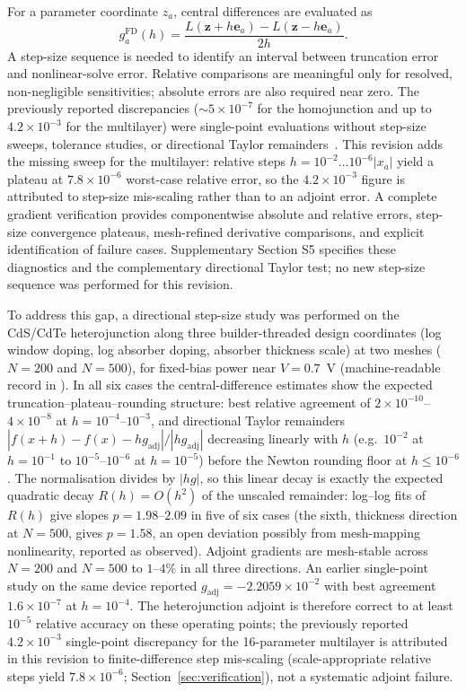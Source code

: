 For a parameter coordinate $z_a$, central differences are evaluated as
\begin{equation}
g_a^{\mathrm{FD}}(h)=
\frac{L(\boldsymbol z+h\boldsymbol e_a)-L(\boldsymbol z-h\boldsymbol e_a)}{2h}.
\end{equation}
A step-size sequence is needed to identify an interval between truncation
error and nonlinear-solve error. Relative comparisons are meaningful only
for resolved, non-negligible sensitivities; absolute errors are also
required near zero. The previously reported discrepancies ($\sim5\times10^{-7}$ for
the homojunction and up to $4.2\times10^{-3}$ for the multilayer) were
single-point evaluations without step-size sweeps, tolerance studies, or
directional Taylor remainders~\cite{dolfinverification}. This revision
adds the missing sweep for the multilayer: relative steps
$h=10^{-2}\dots10^{-6}|x_a|$ yield a plateau at $7.8\times10^{-6}$ worst-case
relative error, so the $4.2\times10^{-3}$ figure is attributed to
step-size mis-scaling rather than to an adjoint error. A complete
gradient verification provides componentwise absolute and relative
errors, step-size convergence plateaus, mesh-refined derivative comparisons,
and explicit identification of failure cases. Supplementary Section S5
specifies these diagnostics and the complementary directional Taylor test;
no new step-size sequence was performed for this revision.

To address this gap, a directional step-size study was performed on the
CdS/CdTe heterojunction along three builder-threaded design coordinates
(log window doping, log absorber doping, absorber thickness scale) at
two meshes ($N=200$ and $N=500$), for fixed-bias power near $V=0.7$~V
(machine-readable record in
). In all six
cases the central-difference estimates show the expected
truncation--plateau--rounding structure: best relative agreement of
$2\times10^{-10}$--$4\times10^{-8}$ at $h=10^{-4}$--$10^{-3}$, and
directional Taylor remainders $|f(x{+}h)-f(x)-hg_{\mathrm{adj}}|/
|hg_{\mathrm{adj}}|$ decreasing linearly with $h$ (e.g.\ $10^{-2}$ at
$h=10^{-1}$ to $10^{-5}$--$10^{-6}$ at $h=10^{-5}$) before the Newton
rounding floor at $h\leq10^{-6}$. The normalisation divides by $|hg|$,
so this linear decay is exactly the expected quadratic decay
$R(h)=O(h^2)$ of the unscaled remainder: log--log fits of $R(h)$
give slopes $p=1.98$--$2.09$ in five of six cases (the sixth,
thickness direction at $N=500$, gives $p=1.58$, an open deviation
possibly from mesh-mapping nonlinearity, reported as observed). Adjoint gradients are mesh-stable
across $N=200$ and $N=500$ to $1$--$4\%$ in all three directions. An
earlier single-point study on the same device reported
$g_{\mathrm{adj}}=-2.2059\times10^{-2}$ with best agreement
$1.6\times10^{-7}$ at $h=10^{-4}$. The heterojunction adjoint is
therefore correct to at least $10^{-5}$ relative accuracy on these
operating points; the previously reported $4.2\times10^{-3}$
single-point discrepancy for the 16-parameter multilayer is attributed
in this revision to finite-difference step mis-scaling (scale-appropriate
relative steps yield $7.8\times10^{-6}$; Section~\ref{sec:verification}),
not a systematic
adjoint failure.

